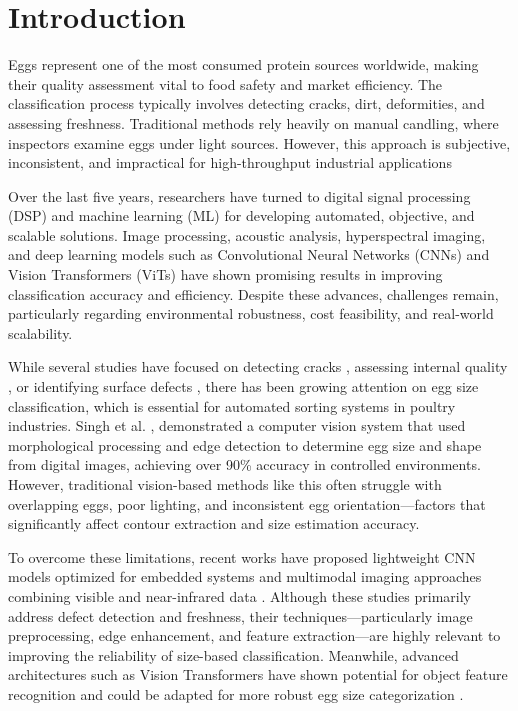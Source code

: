 \documentclass[conference]{IEEEtran}
\begin{document}
	\section{Introduction}
	Eggs represent one of the most consumed protein sources worldwide, making their quality assessment vital to food safety and market efficiency. The classification process typically involves detecting cracks, dirt, deformities, and assessing freshness. Traditional methods rely heavily on manual candling, where inspectors examine eggs under light sources. However, this approach is subjective, inconsistent, and impractical for high-throughput industrial applications 
	
	Over the last five years, researchers have turned to digital signal processing (DSP) and machine learning (ML) for developing automated, objective, and scalable solutions. Image processing, acoustic analysis, hyperspectral imaging, and deep learning models such as Convolutional Neural Networks (CNNs) and Vision Transformers (ViTs) have shown promising results in improving classification accuracy and efficiency. Despite these advances, challenges remain, particularly regarding environmental robustness, cost feasibility, and real-world scalability.  
	
	While several studies have focused on detecting cracks \cite{zhang2020cnn}, assessing internal quality \cite{li2021hsi}, or identifying surface defects \cite{chen2022lightweight}, there has been growing attention on egg size classification, which is essential for automated sorting systems in poultry industries. Singh et al. \cite{singh2022vision}, demonstrated a computer vision system that used morphological processing and edge detection to determine egg size and shape from digital images, achieving over 90\% accuracy in controlled environments. However, traditional vision-based methods like this often struggle with overlapping eggs, poor lighting, and inconsistent egg orientation—factors that significantly affect contour extraction and size estimation accuracy.
	
	To overcome these limitations, recent works have proposed lightweight CNN models optimized for embedded systems and multimodal imaging approaches combining visible and near-infrared data \cite{chen2022lightweight} \cite{garcia2024fusion}. Although these studies primarily address defect detection and freshness, their techniques—particularly image preprocessing, edge enhancement, and feature extraction—are highly relevant to improving the reliability of size-based classification. Meanwhile, advanced architectures such as Vision Transformers have shown potential for object feature recognition and could be adapted for more robust egg size categorization \cite{huang2025vit}.
	
\end{document}
